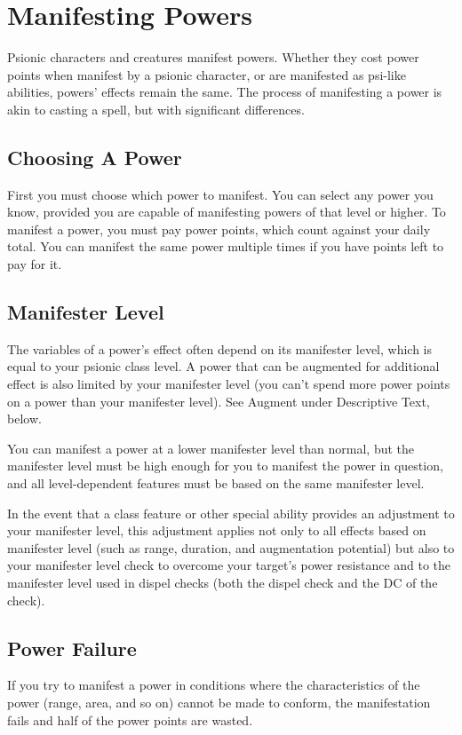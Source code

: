 \section{Manifesting Powers}
Psionic characters and creatures manifest powers. Whether they cost power points when manifest by a psionic character, or are manifested as psi-like abilities, powers' effects remain the same. The process of manifesting a power is akin to casting a spell, but with significant differences.

\subsection{Choosing A Power}
First you must choose which power to manifest. You can select any power you know, provided you are capable of manifesting powers of that level or higher. To manifest a power, you must pay power points, which count against your daily total. You can manifest the same power multiple times if you have points left to pay for it.




\subsection{Manifester Level}
The variables of a power's effect often depend on its manifester level, which is equal to your psionic class level. A power that can be augmented for additional effect is also limited by your manifester level (you can't spend more power points on a power than your manifester level). See Augment under Descriptive Text, below.

You can manifest a power at a lower manifester level than normal, but the manifester level must be high enough for you to manifest the power in question, and all level-dependent features must be based on the same manifester level.

In the event that a class feature or other special ability provides an adjustment to your manifester level, this adjustment applies not only to all effects based on manifester level (such as range, duration, and augmentation potential) but also to your manifester level check to overcome your target's power resistance and to the manifester level used in dispel checks (both the dispel check and the DC of the check).

\subsection{Power Failure}
If you try to manifest a power in conditions where the characteristics of the power (range, area, and so on) cannot be made to conform, the manifestation fails and half of the power points are wasted.

